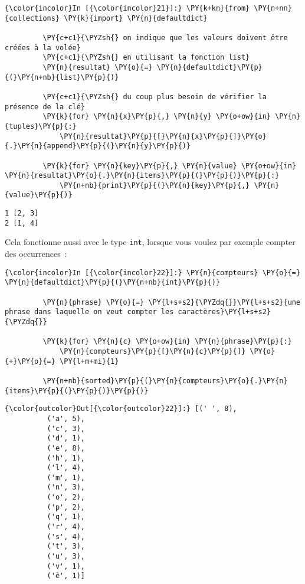     \begin{Verbatim}[commandchars=\\\{\}]
{\color{incolor}In [{\color{incolor}21}]:} \PY{k+kn}{from} \PY{n+nn}{collections} \PY{k}{import} \PY{n}{defaultdict}
         
         \PY{c+c1}{\PYZsh{} on indique que les valeurs doivent être créées à la volée}
         \PY{c+c1}{\PYZsh{} en utilisant la fonction list}
         \PY{n}{resultat} \PY{o}{=} \PY{n}{defaultdict}\PY{p}{(}\PY{n+nb}{list}\PY{p}{)}
         
         \PY{c+c1}{\PYZsh{} du coup plus besoin de vérifier la présence de la clé}
         \PY{k}{for} \PY{n}{x}\PY{p}{,} \PY{n}{y} \PY{o+ow}{in} \PY{n}{tuples}\PY{p}{:}
             \PY{n}{resultat}\PY{p}{[}\PY{n}{x}\PY{p}{]}\PY{o}{.}\PY{n}{append}\PY{p}{(}\PY{n}{y}\PY{p}{)}
         
         \PY{k}{for} \PY{n}{key}\PY{p}{,} \PY{n}{value} \PY{o+ow}{in} \PY{n}{resultat}\PY{o}{.}\PY{n}{items}\PY{p}{(}\PY{p}{)}\PY{p}{:}
             \PY{n+nb}{print}\PY{p}{(}\PY{n}{key}\PY{p}{,} \PY{n}{value}\PY{p}{)}
\end{Verbatim}


    \begin{Verbatim}[commandchars=\\\{\}]
1 [2, 3]
2 [1, 4]

    \end{Verbatim}

    Cela fonctionne aussi avec le type \texttt{int}, lorsque vous voulez par
exemple compter des occurrences~:

    \begin{Verbatim}[commandchars=\\\{\}]
{\color{incolor}In [{\color{incolor}22}]:} \PY{n}{compteurs} \PY{o}{=} \PY{n}{defaultdict}\PY{p}{(}\PY{n+nb}{int}\PY{p}{)}
         
         \PY{n}{phrase} \PY{o}{=} \PY{l+s+s2}{\PYZdq{}}\PY{l+s+s2}{une phrase dans laquelle on veut compter les caractères}\PY{l+s+s2}{\PYZdq{}}
         
         \PY{k}{for} \PY{n}{c} \PY{o+ow}{in} \PY{n}{phrase}\PY{p}{:}
             \PY{n}{compteurs}\PY{p}{[}\PY{n}{c}\PY{p}{]} \PY{o}{+}\PY{o}{=} \PY{l+m+mi}{1}
         
         \PY{n+nb}{sorted}\PY{p}{(}\PY{n}{compteurs}\PY{o}{.}\PY{n}{items}\PY{p}{(}\PY{p}{)}\PY{p}{)}
\end{Verbatim}


\begin{Verbatim}[commandchars=\\\{\}]
{\color{outcolor}Out[{\color{outcolor}22}]:} [(' ', 8),
          ('a', 5),
          ('c', 3),
          ('d', 1),
          ('e', 8),
          ('h', 1),
          ('l', 4),
          ('m', 1),
          ('n', 3),
          ('o', 2),
          ('p', 2),
          ('q', 1),
          ('r', 4),
          ('s', 4),
          ('t', 3),
          ('u', 3),
          ('v', 1),
          ('è', 1)]
\end{Verbatim}
            
